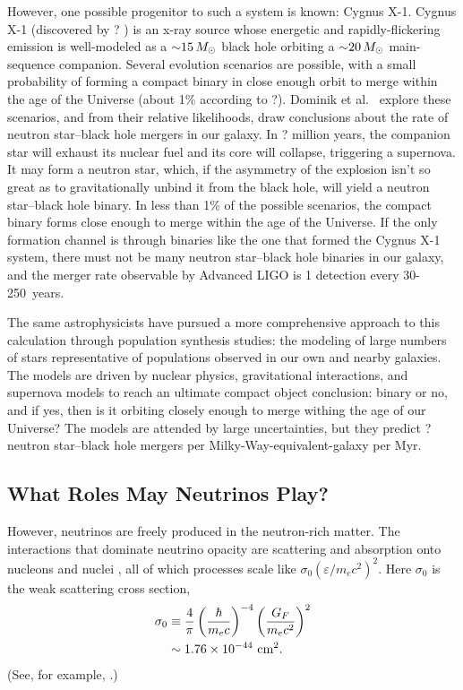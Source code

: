 However, one possible progenitor to such a system is known: Cygnus X-1.
Cygnus X-1 (discovered by ?
)
is an x-ray source whose energetic and rapidly-flickering emission
is well-modeled as a $\mathord{\sim}15\,M_\odot$ black hole orbiting a $\mathord{\sim}20\,M_\odot$
main-sequence companion.
Several evolution scenarios are possible, with a small probability of forming
a compact binary in close enough orbit to merge within the age of the Universe
(about 1\% according to ?).
Dominik et al.\
explore these scenarios, and from their relative likelihoods, draw conclusions
about the rate of neutron star--black hole mergers in our galaxy.
In ? million years,
the companion star will exhaust its nuclear fuel and its core will collapse,
triggering a supernova. It may form a neutron star, which, if the asymmetry of
the explosion isn't so great as to gravitationally unbind it from the black hole,
will yield a neutron star--black hole binary. In less than 1\% of the possible
scenarios, the compact binary forms close enough to merge within the age of the
Universe. If the only formation channel is through
binaries like the one that formed the Cygnus X-1 system, there must not be many
neutron star--black hole binaries in our galaxy, and the merger rate observable
by Advanced LIGO is 1 detection every 30-250~years.

The same astrophysicists have pursued a more comprehensive approach to this
calculation through population synthesis studies: the modeling of large numbers
of stars representative of populations observed in our own and nearby galaxies.
The models are driven by nuclear physics, gravitational interactions, and
supernova models to reach an ultimate compact object conclusion: binary or no,
and if yes, then is it orbiting closely enough to merge withing the age of
our Universe? The models are attended by large uncertainties, but they
predict ? neutron star--black hole mergers per Milky-Way-equivalent-galaxy
per Myr.

\subsection{What Roles May Neutrinos Play?}


However, neutrinos are freely produced in the neutron-rich matter. The
interactions that dominate neutrino opacity are scattering and absorption onto
nucleons and nuclei \citep[Sec.\ 11.7]{shap1983-bh_wd_ns}, all of which processes
scale like $\sigma_0(\varepsilon/m_e c^2)^2$. Here $\sigma_0$ is the weak
scattering cross section,
\begin{align}
  \sigma_0
  &\equiv \frac{4}{\pi}\left(\frac{\hbar}{m_e c}\right)^{-4}
  \left(\frac{G_F}{m_e c^2}\right)^2 \\
  &\sim   1.76 \times 10^{-44} \,\, {\rm cm}^2.
\end{align}
(See, for example, \citealt{tubb1975-neutrino_opacities}.)

